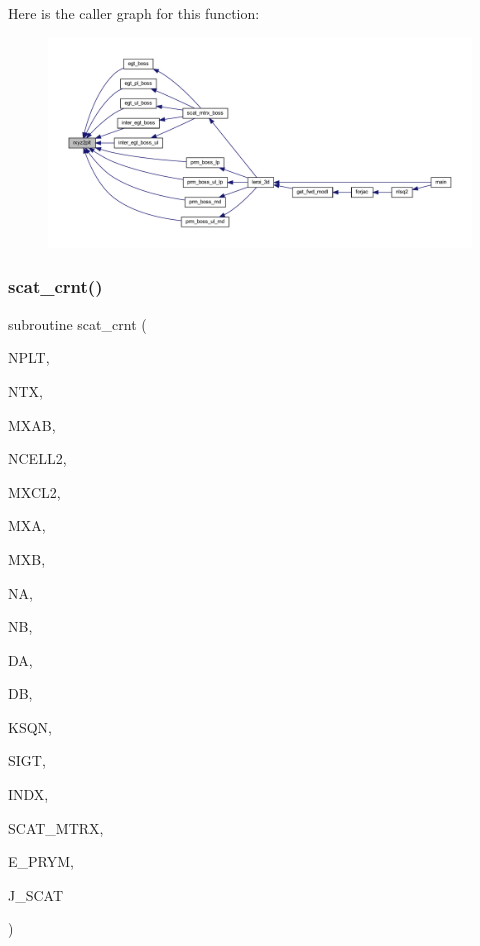 Here is the caller graph for this function\+:\nopagebreak
\begin{figure}[H]
\begin{center}
\leavevmode
\includegraphics[width=350pt]{Leroi_8f90_af139b1e21e0c1e77a354000840adee66_icgraph}
\end{center}
\end{figure}
\mbox{\label{Leroi_8f90_aef77ff6f17e654fc7f89a638ad1d2d46}} 
\subsubsection{\texorpdfstring{scat\+\_\+crnt()}{scat\_crnt()}}
{\footnotesize\ttfamily subroutine scat\+\_\+crnt (\begin{DoxyParamCaption}\item[{integer, intent(in)}]{N\+P\+LT,  }\item[{integer, intent(in)}]{N\+TX,  }\item[{integer, intent(in)}]{M\+X\+AB,  }\item[{integer, dimension(0\+:nplt), intent(in)}]{N\+C\+E\+L\+L2,  }\item[{integer, intent(in)}]{M\+X\+C\+L2,  }\item[{integer, intent(in)}]{M\+XA,  }\item[{integer, intent(in)}]{M\+XB,  }\item[{integer, dimension(nplt), intent(in)}]{NA,  }\item[{integer, dimension(nplt), intent(in)}]{NB,  }\item[{real, dimension(nplt), intent(in)}]{DA,  }\item[{real, dimension(nplt), intent(in)}]{DB,  }\item[{complex, intent(in)}]{K\+S\+QN,  }\item[{complex, dimension(nplt), intent(in)}]{S\+I\+GT,  }\item[{integer, dimension(mxcl2), intent(in)}]{I\+N\+DX,  }\item[{complex, dimension(mxcl2,mxcl2), intent(in)}]{S\+C\+A\+T\+\_\+\+M\+T\+RX,  }\item[{complex, dimension(2,mxab,ntx,nplt), intent(in)}]{E\+\_\+\+P\+R\+YM,  }\item[{complex, dimension(2,mxab,ntx,nplt), intent(out)}]{J\+\_\+\+S\+C\+AT }\end{DoxyParamCaption})}


